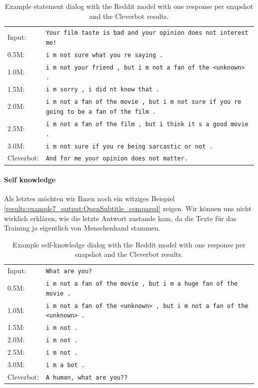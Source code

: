 \begin{table}[H]
	\centering
	\begin{adjustbox}{max width=\textwidth}
		\begin{tabular}{ll}
			\toprule
			Input: 	& \texttt{Your film taste is bad and your opinion does not interest me!}\\
			0.5M: 	& \texttt{i m not sure what you re saying .}\\
			1.0M: 	& \texttt{i m not your friend , but i m not a fan of the <unknown> .}\\
			1.5M:	& \texttt{i m sorry , i did nt know that .}\\
			2.0M:	& \texttt{i m not a fan of the movie , but i m not sure if you re going to be a fan of the film .}\\
			2.5M:	& \texttt{i m not a fan of the film , but i think it s a good movie .}\\
			3.0M:	& \texttt{i m not sure if you re being sarcastic or not .}\\
			Cleverbot:	& \texttt{And for me your opinion does not matter.}\\
			\bottomrule
		\end{tabular}
	\end{adjustbox}
	\caption{Example statement dialog with the Reddit model with one response per snapshot and the Cleverbot results.}
	\label{results:example6_output:Reddit_compared}
\end{table}

\paragraph{Self knowledge}Als letztes möchten wir Ihnen noch ein witziges Beispiel \ref{results:example7_output:OpenSubtitle_compared} zeigen. Wir können uns nicht wirklich erklären, wie die letzte Antwort zustande kam, da die Texte für das Training ja eigentlich von Menschenhand stammen.
\begin{table}[H]
	\centering
	\begin{adjustbox}{max width=\textwidth}
		\begin{tabular}{ll}
			\toprule
			Input: 	& \texttt{What are you?}\\
			0.5M: 	& \texttt{i m not a fan of the movie , but i m a huge fan of the movie .}\\
			1.0M: 	& \texttt{i m not a fan of the <unknown> , but i m not a fan of the <unknown> .}\\
			1.5M:	& \texttt{i m not .}\\
			2.0M:	& \texttt{i m not .}\\
			2.5M:	& \texttt{i m not .}\\
			3.0M:	& \texttt{i m a bot .}\\
			Cleverbot:	& \texttt{A human, what are you??}\\
			\bottomrule
		\end{tabular}
	\end{adjustbox}
	\caption{Example self-knowledge dialog with the Reddit model with one response per snapshot and the Cleverbot results.}
	\label{results:example7_output:Reddit_compared}
\end{table}

